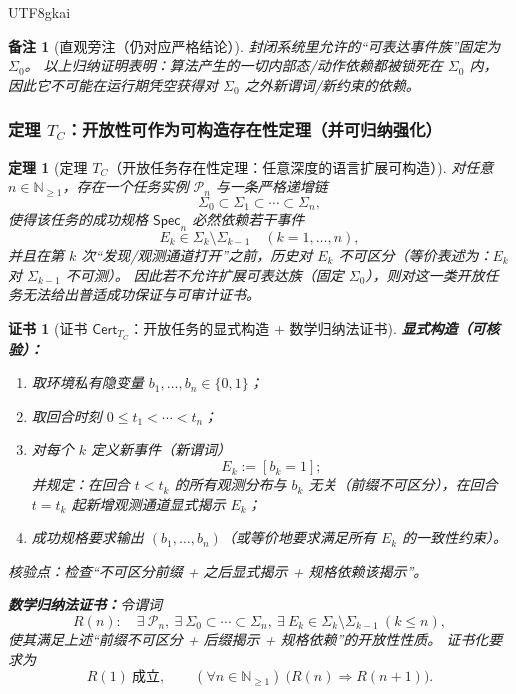 \documentclass[12pt]{article}
\newtheorem{theorem}{定理}[section]
\newtheorem{remark}{备注}[section]
\newtheorem{Certificate}{证书}[section]
\newcommand{\NN}{\ensuremath{\mathbb{N}}}
\begin{document}
\begin{CJK*}{UTF8}{gkai}
\begin{remark}[直观旁注（仍对应严格结论）]
封闭系统里允许的“可表达事件族”固定为 $\Sigma_0$。
以上归纳证明表明：算法产生的一切内部态/动作依赖都被锁死在 $\Sigma_0$ 内，
因此它不可能在运行期凭空获得对 $\Sigma_0$ 之外新谓词/新约束的依赖。
\end{remark}

\subsubsection{定理 $T_C$：开放性可作为可构造存在性定理（并可归纳强化）}
\label{subsec:tex24-tc}

\begin{theorem}[定理 $T_C$（开放任务存在性定理：任意深度的语言扩展可构造）]
\label{thm:tex24-tc}
对任意 $n\in\NN_{\ge 1}$，存在一个任务实例 $\mathcal{P}_n$ 与一条严格递增链
\[
  \Sigma_0\subset \Sigma_1\subset\cdots\subset \Sigma_n,
\]
使得该任务的成功规格 $\mathsf{Spec}_n$ 必然依赖若干事件
\[
  E_k\in\Sigma_k\setminus\Sigma_{k-1}\quad (k=1,\dots,n),
\]
并且在第 $k$ 次“发现/观测通道打开”之前，历史对 $E_k$ 不可区分（等价表述为：$E_k$ 对 $\Sigma_{k-1}$ 不可测）。
因此若不允许扩展可表达族（固定 $\Sigma_0$），则对这一类开放任务无法给出普适成功保证与可审计证书。
\end{theorem}

\begin{Certificate}[证书 $\mathsf{Cert}_{T_C}$：开放任务的显式构造 + 数学归纳法证书]
\label{cert:tex24-tc}
\textbf{显式构造（可核验）：}
\begin{enumerate}
  \item 取环境私有隐变量 $b_1,\dots,b_n\in\{0,1\}$；
  \item 取回合时刻 $0\le t_1<\cdots<t_n$；
  \item 对每个 $k$ 定义新事件（新谓词）
  \[
    E_k:=[b_k=1];
  \]
  并规定：在回合 $t<t_k$ 的所有观测分布与 $b_k$ 无关（前缀不可区分），在回合 $t=t_k$ 起新增观测通道显式揭示 $E_k$；
  \item 成功规格要求输出 $(b_1,\dots,b_n)$（或等价地要求满足所有 $E_k$ 的一致性约束）。
\end{enumerate}
核验点：检查“不可区分前缀 + 之后显式揭示 + 规格依赖该揭示”。

\textbf{数学归纳法证书：}令谓词
\[
  R(n):\quad \exists\ \mathcal{P}_n,\ \exists\ \Sigma_0\subset\cdots\subset\Sigma_n,\ \exists\
    E_k\in\Sigma_k\setminus\Sigma_{k-1}\ (k\le n),
\]
使其满足上述“前缀不可区分 + 后缀揭示 + 规格依赖”的开放性性质。
证书化要求为
\[
  R(1)\ \text{成立},\qquad
  (\forall n\in\NN_{\ge 1})\ \bigl(R(n)\Rightarrow R(n+1)\bigr).
\]
\end{Certificate}


\end{CJK*}
\end{document}
